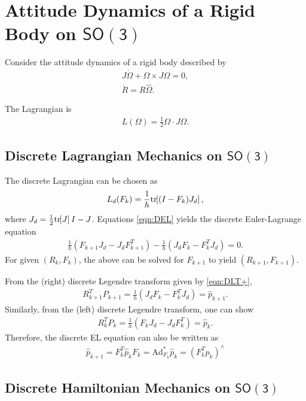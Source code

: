 \documentclass[letterpaper, 10pt, conference]{ieeeconf}
\newcommand{\bracket}[1]{\ensuremath{\left[ #1 \right]}}
\newcommand{\tr}[1]{\mbox{tr}\ensuremath{\negthickspace\bracket{#1}}}
\newcommand{\SO}{\ensuremath{\mathsf{SO(3)}}}
\newcommand{\Ad}{\ensuremath{\mathrm{Ad}}}
\begin{document}
\section{Attitude Dynamics of a Rigid Body on $\SO$}

Consider the attitude dynamics of a rigid body described by
\begin{gather*}
    J\dot\Omega + \Omega\times J\Omega = 0, \\
    \dot R = R\hat\Omega.
\end{gather*}

The Lagrangian is
\begin{align*}
    L(\Omega) = \frac{1}{2}\Omega \cdot J\Omega.
\end{align*}

\subsection{Discrete Lagrangian Mechanics on $\SO$}

The discrete Lagrangian can be chosen as
\begin{align*}
    L_d (F_k) = \frac{1}{h} \tr{ (I-F_k) J_d},
\end{align*}
where $J_d = \frac{1}{2}\tr{J}I- J$.
Equations \eqref{eqn:DEL} yields the discrete Euler-Lagrange equation
\begin{align*}
    \frac{1}{h} ( F_{k+1}J_d - J_d F_{k+1}^T ) -\frac{1}{h} (J_d F_k - F_k^T J_d) = 0.
\end{align*}
For given $(R_k,F_k)$, the above can be solved for $F_{k+1}$ to yield $(R_{k+1}, F_{k+1})$.

From the (right) discrete Legendre transform given by \eqref{eqn:DLT+},
\begin{align}
    R_{k+1}^T P_{k+1}  = \frac{1}{h}(J_d F_k - F_k^T J_d) =\hat p_{k+1}. \label{eqn:Pkp}
\end{align}
Similarly, from the (left) discrete Legendre transform, one can show
\begin{align*}
    R_k^T P_k = \frac{1}{h} (F_k J_d - J_d F_k^T) = \hat p_k.
\end{align*}
Therefore, the discrete EL equation can also be written as
\begin{align*}
    \hat p_{k+1} = F_k^T \hat p_k F_k  = \Ad^*_{F_k} \hat p_k = (F_k^Tp_k)^\wedge
\end{align*}

\subsection{Discrete Hamiltonian Mechanics on $\SO$}
\end{document}
